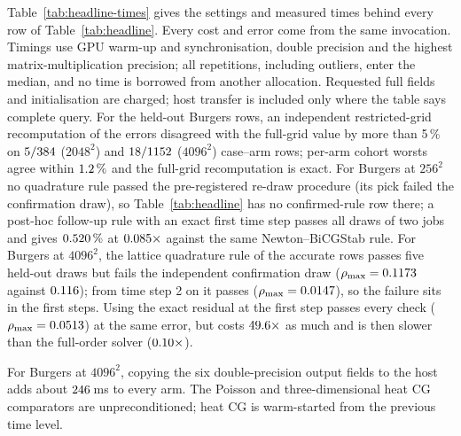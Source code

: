 Table~\ref{tab:headline-times} gives the settings and measured times
behind every row of Table~\ref{tab:headline}. Every cost and error come
from the same invocation. Timings use GPU warm-up and synchronisation,
double precision and the highest matrix-multiplication precision; all
repetitions, including outliers, enter the median, and no time is
borrowed from another allocation. Requested full fields and
initialisation are charged; host transfer is included only where the
table says complete query. For the held-out Burgers rows, an independent
restricted-grid recomputation of the errors disagreed with the full-grid
value by more than 5\,\% on $5/384$
($2048^2$) and $18/1152$
($4096^2$) case--arm rows; per-arm cohort worsts agree within
$1.2\,\%$ and the full-grid recomputation is exact. For Burgers at $256^2$ no quadrature rule passed the pre-registered
re-draw procedure (its pick failed the confirmation draw), so
Table~\ref{tab:headline} has no confirmed-rule row there; a post-hoc
follow-up rule with an exact first time step passes all
\nEqcFollowDraws{} draws of two jobs and gives $0.520\,\%$ at
$0.085\times$ against the same Newton--BiCGStab rule. For Burgers at $4096^2$, the lattice quadrature rule of the accurate
rows passes five held-out draws but fails the independent confirmation
draw ($\rho_{\max}=0.1173$ against $0.116$); from time step 2 on
it passes ($\rho_{\max}=0.0147$), so the failure sits in the
first steps. Using the exact residual at the first step passes every
check ($\rho_{\max}=0.0513$) at the same error, but costs
$49.6\times$ as much and is then slower than the full-order
solver ($0.10\times$).

For Burgers at $4096^2$, copying the six
double-precision output fields to the host adds about
$246$\,ms to every arm. The Poisson and three-dimensional heat CG comparators are
unpreconditioned; heat CG is warm-started from the previous time level. 

